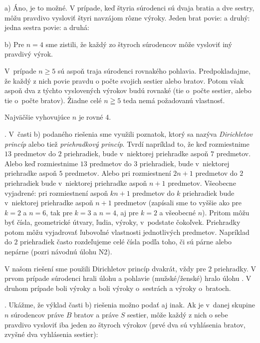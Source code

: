 {%
a) Áno, je to možné. V prípade, keď štyria súrodenci sú dvaja bratia
a dve sestry, môžu pravdivo vysloviť štyri navzájom rôzne
výroky. Jeden brat povie:  a druhý:
 jedna sestra povie:  a
druhá: 

\smallskip
b) Pre $n=4$ sme zistili, že každý zo štyroch súrodencov
môže vysloviť iný pravdivý výrok.

V~prípade $n\ge 5$ sú aspoň traja súrodenci rovnakého pohlavia.
Predpokladajme, že každý z nich povie pravdu o počte
svojich sestier alebo bratov. Potom však aspoň dva
z týchto vyslovených výrokov budú rovnaké (tie o~počte sestier,
alebo tie o~počte bratov). Žiadne celé $n\geqq5$ teda
nemá požadovanú vlastnosť.

\zaver
Najväčšie vyhovujúce $n$ je rovné 4.

.
V~časti b) podaného riešenia sme
využili poznatok, ktorý sa nazýva \emph{Dirichletov princíp}
alebo tiež \emph{priehradkový princíp}.
Tvrdí napríklad to, že keď rozmiestnime $13$ predmetov
do $2$ priehradiek, bude v~niektorej priehradke aspoň $7$ predmetov.
Alebo keď rozmiestnime $13$ predmetov do $3$ priehradiek, bude
v~niektorej priehradke aspoň $5$ predmetov. Alebo pri rozmiestnení
$2n+1$ predmetov do $2$ priehradiek bude v~niektorej priehradke aspoň
$n+1$ predmetov. Všeobecne vyjadrené: pri rozmiestnení aspoň ${kn+1}$
predmetov do $k$ priehradiek bude v~niektorej priehradke aspoň $n+1$
predmetov (zapísali sme to vyššie ako pre $k=2$ a $n=6$, tak pre
$k=3$ a $n=4$, aj pre $k=2$ a všeobecné $n$).
Pritom  môžu byť čísla,
geometrické útvary, ľudia, výroky, v~podstate čokoľvek.
Priehradky potom môžu vyjadrovať ľubovoľné vlastnosti jednotlivých
predmetov. Napríklad do $2$ priehradiek často
rozdeľujeme celé čísla podľa toho, či sú párne alebo nepárne
(pozri návodnú úlohu N2).

V našom riešení sme použili Dirichletov princíp dvakrát,
vždy pre $2$ priehradky. V prvom prípade súrodenci hrali úlohu
 a pohlavie (mužské/ženské) hralo úlohu
. V druhom prípade boli  výroky a
 boli výroky o~sestrách a
výroky o~bratoch.

.
Ukážme, že výklad časti b) riešenia možno podať aj inak.
Ak je v~danej skupine $n$ súrodencov práve $B$ bratov a práve $S$ sestier,
môže každý z nich o sebe pravdivo vysloviť iba jeden zo štyroch výrokov
(prvé dva sú vyhlásenia bratov, zvyšné dva vyhlásenia sestier):

}

